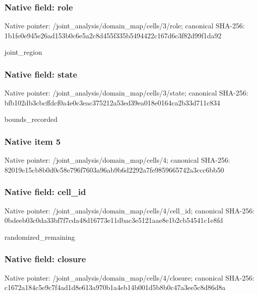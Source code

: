 \documentclass[10pt,a4paper]{article}
\begin{document}
\subsubsection{Native field: role}
Native pointer: /joint\_\allowbreak{}analysis/domain\_\allowbreak{}map/cells/3/role; canonical SHA-256: 1b1fe0e945e26ad153b0c6e5a2c8d455f335b5494422c167d6c3f82d99f1da92

\begingroup\raggedright\sloppy joint\_\allowbreak{}region\par\endgroup

\subsubsection{Native field: state}
Native pointer: /joint\_\allowbreak{}analysis/domain\_\allowbreak{}map/cells/3/state; canonical SHA-256: bfb102db3cbcffdcf0a4e0c3eac375212a53ed39ea018e0164ca2b33d711c834

\begingroup\raggedright\sloppy bounds\_\allowbreak{}recorded\par\endgroup

\subsubsection{Native item 5}
Native pointer: /joint\_\allowbreak{}analysis/domain\_\allowbreak{}map/cells/4; canonical SHA-256: 82019e15cb8b0d0c58e796f7603a96ab9b6d2292a7fe9859665742a3ccc6bb50

\subsubsection{Native field: cell\_\allowbreak{}id}
Native pointer: /joint\_\allowbreak{}analysis/domain\_\allowbreak{}map/cells/4/cell\_\allowbreak{}id; canonical SHA-256: 0bdeeb03c0da33bf7f7cda48d16773e11dbac3e5121aae8e1b2cb54541c1e8fd

\begingroup\raggedright\sloppy randomized\_\allowbreak{}remaining\par\endgroup

\subsubsection{Native field: closure}
Native pointer: /joint\_\allowbreak{}analysis/domain\_\allowbreak{}map/cells/4/closure; canonical SHA-256: c1672a184c5e9c7f4ad1d8e613a970b1a4eb14b001d5b8b0c47a3ee5c8d86d8a
\end{document}
